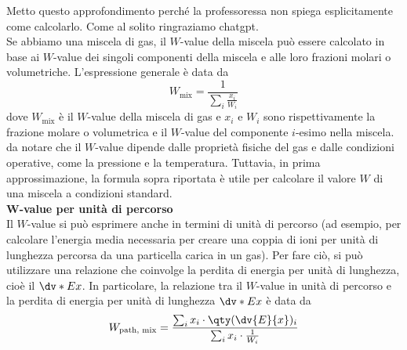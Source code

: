 \begin{approfondimento}
   \footnotesize
   Metto questo approfondimento perché la professoressa non spiega esplicitamente come calcolarlo. Come al solito ringraziamo chatgpt.\\[0.2cm]
   Se abbiamo una miscela di gas, il $W$-value della miscela può essere calcolato in base ai $W$-value dei singoli componenti della miscela e alle loro frazioni molari o volumetriche. L'espressione generale è data da
   \begin{equation*}
      W_{\text{mix}} = \frac{1}{\sum_i \frac{x_i}{W_i}}
   \end{equation*}
   dove $W_{\text{mix}}$ è il $W$-value della miscela di gas e $x_i$ e $W_i$ sono rispettivamente la frazione molare o volumetrica e il $W$-value del componente $i$-esimo nella miscela.\\
   \E da notare che il $W$-value dipende dalle proprietà fisiche del gas e dalle condizioni operative, come la pressione e la temperatura. Tuttavia, in prima approssimazione, la formula sopra riportata è utile per calcolare il valore $W$ di una miscela a condizioni standard.\\[0.2cm]
   \textbf{$\boldsymbol{W}$-value per unità di percorso}\\
   Il $W$-value si può esprimere anche in termini di unità di percorso (ad esempio, per calcolare l'energia media necessaria per creare una coppia di ioni per unità di lunghezza percorsa da una particella carica in un gas). Per fare ciò, si può utilizzare una relazione che coinvolge la perdita di energia per unità di lunghezza, cioè il $\dv*{E}{x}$. In particolare, la relazione tra il $W$-value in unità di percorso e la perdita di energia per unità di lunghezza $\dv*{E}{x}$ è data da
   \begin{equation*}
      W_{\text{path, mix}}
      =\frac{\sum_i x_i \cdot \qty( \dv{E}{x} )_i}{\sum_i x_i \cdot \frac{1}{W_i}}
   \end{equation*}

\end{approfondimento}
